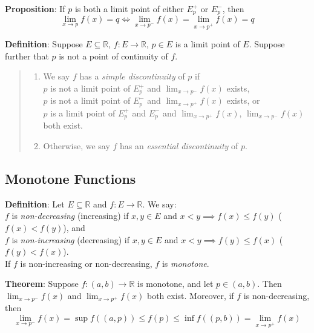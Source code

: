 \documentclass[11pt]{article}
\begin{document}
\textbf{Proposition}: If $p$ is both a limit point of either $E_p^+$ or $E_p^-$, then
\begin{displaymath}
\lim_{x \to p} f(x) = q \iff \lim_{x \to p^-} f(x) = \lim_{x \to p^+} f(x) = q
\end{displaymath}

\textbf{Definition}: Suppose $E \subseteq \mathbb{R}$, $f : E \to \mathbb{R}$, $p \in E$ is a limit point of $E$. Suppose further that $p$ is not a point of continuity of $f$.
\begin{quote}\vspace{-0.3cm}
	\begin{enumerate}
	\item We say $f$ has a \emph{simple discontinuity} of $p$ if\\
	$p$ is not a limit point of $E_p^+$ and $\lim_{x \to p^-} f(x)$ exists,\\
	$p$ is not a limit point of $E_p^-$ and $\lim_{x \to p^+} f(x)$ exists, or\\
	$p$ is a limit point of $E_p^+$ and $E_p^-$ and $\lim_{x \to p^+} f(x)$, $\lim_{x \to p^-} f(x)$ both exist.

	\item Otherwise, we say $f$ has an \emph{essential discontinuity} of $p$.
	\end{enumerate}
\end{quote}

\subsection{Monotone Functions}

\textbf{Definition}: Let $E \subseteq \mathbb{R}$ and $f : E \to \mathbb{R}$. We say:\\
$f$ is \emph{non-decreasing} (increasing) if $x,y \in E$ and $x < y \implies f(x) \leq f(y)$ ($f(x) < f(y)$), and\\
$f$ is \emph{non-increasing} (decreasing) if $x,y \in E$ and $x < y \implies f(y) \leq f(x)$ ($f(y) < f(x)$).\\
If $f$ is non-increasing or non-decreasing, $f$ is \emph{monotone}.

\textbf{Theorem}: Suppose $f : (a,b) \to \mathbb{R}$ is monotone, and let $p \in (a,b)$. Then $\lim_{x \to p^-} f(x)$ and $\lim_{x \to p^+} f(x)$ both exist. Moreover, if $f$ is non-decreasing, then
\begin{displaymath}\lim_{x \to p^-} f(x) = \sup f((a,p)) \leq f(p) \leq \inf f((p,b)) = \lim_{x \to p^+} f(x)\end{displaymath}
\end{document}
